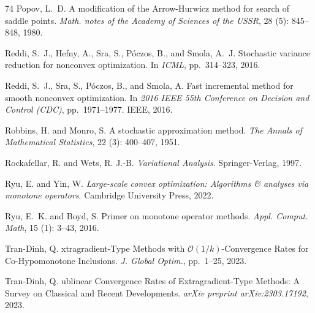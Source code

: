 \documentclass{article}
\theoremstyle{plain}
\theoremstyle{definition}
\theoremstyle{remark}
\begin{document}
\begin{thebibliography}{74}
Popov, L.~D.
\newblock A modification of the {A}rrow-{H}urwicz method for search of saddle
  points.
\newblock \emph{Math. notes of the Academy of Sciences of the USSR},
  28 (5): 845--848, 1980.

Reddi, S.~J., Hefny, A., Sra, S., P{\'{o}}czos, B., and Smola, A.~J.
\newblock Stochastic variance reduction for nonconvex optimization.
\newblock In \emph{ICML}, pp.\  314--323, 2016{}.

Reddi, S.~J., Sra, S., P{\'o}czos, B., and Smola, A.
\newblock Fast incremental method for smooth nonconvex optimization.
\newblock In \emph{2016 IEEE 55th Conference on Decision and Control (CDC)},
  pp.\  1971--1977. IEEE, 2016{}.

Robbins, H. and Monro, S.
\newblock A stochastic approximation method.
\newblock \emph{The Annals of Mathematical Statistics}, 22
  (3): 400--407, 1951.

Rockafellar, R. and Wets, R. J.-B.
\newblock \emph{{V}ariational {A}nalysis}.
\newblock Springer-Verlag, 1997.

Ryu, E. and Yin, W.
\newblock \emph{Large-scale convex optimization: {A}lgorithms \& analyses via
  monotone operators}.
\newblock Cambridge University Press, 2022.

Ryu, E.~K. and Boyd, S.
\newblock Primer on monotone operator methods.
\newblock \emph{Appl. Comput. Math}, 15 (1): 3--43, 2016.

Tran-Dinh, Q.
xtragradient-{T}ype {M}ethods with
  $\mathcal{O}(1/k)$-{C}onvergence {R}ates for {C}o-{H}ypomonotone
  {I}nclusions.
\newblock \emph{J. Global Optim.}, pp.\  1--25, 2023{}.

Tran-Dinh, Q.
ublinear {C}onvergence {R}ates of {E}xtragradient-{T}ype
  {M}ethods: {A} {S}urvey on {C}lassical and {R}ecent {D}evelopments.
\newblock \emph{arXiv preprint arXiv:2303.17192}, 2023{}.


\end{thebibliography}
\end{document}
